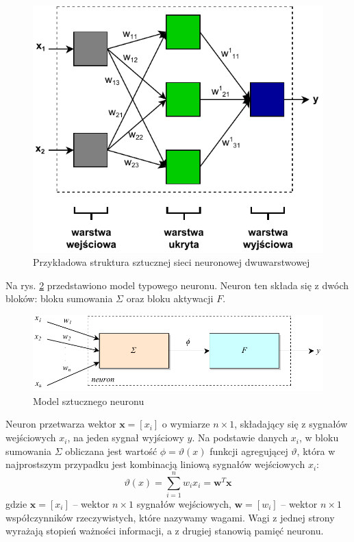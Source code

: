 \begin{figure}[h]
	\centering
	\includegraphics[scale=1.0]{graphics/01_podstawy_teoretyczne/ssn-przykladowa-siec.pdf}
	\caption{ Przykładowa struktura sztucznej sieci neuronowej dwuwarstwowej }
	\label{fig:ssn-przykladowa-siec}
\end{figure}

Na rys. \ref{fig:ssn-neuron} przedstawiono model typowego neuronu. Neuron ten składa się z dwóch bloków: bloku sumowania $\Sigma$ oraz bloku aktywacji $F$.

\begin{figure}[h]
	\centering
	\includegraphics[scale=1.0]{graphics/01_podstawy_teoretyczne/ssn-neuron.pdf}
	\caption{ Model sztucznego neuronu }
	\label{fig:ssn-neuron}
\end{figure}

Neuron przetwarza wektor $\boldsymbol{x} = [x_i]$ o wymiarze $n \times 1$, składający się z sygnałów wejściowych $x_i$, na jeden sygnał wyjściowy $y$. Na podstawie danych $x_i$, w bloku sumowania $\Sigma$ obliczana jest wartość $\phi = \vartheta(x)$ funkcji agregującej $\vartheta$, która w najprostszym przypadku jest kombinacją liniową sygnałów wejściowych $x_i$:
\begin{equation} 
\label{ssn_vartheta} 
\vartheta(x) = \sum\limits_{i = 1}^n w_ix_i = \boldsymbol{w}^T\boldsymbol{x}
\end{equation} gdzie $\boldsymbol{x} = [x_i]$ -- wektor $n \times 1$ sygnałów wejściowych, $\boldsymbol{w} = [w_i]$ -- wektor $n \times 1$ współczynników rzeczywistych, które nazywamy wagami. Wagi z jednej strony wyrażają stopień ważności informacji, a z drugiej stanowią pamięć neuronu.

